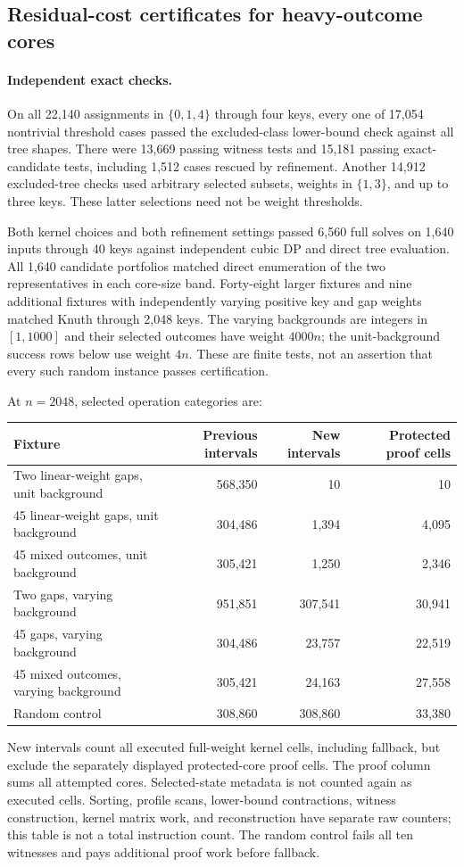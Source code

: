 \documentclass[11pt]{article}
\begin{document}
\subsection{Residual-cost certificates for heavy-outcome cores}
\paragraph{Independent exact checks.}
On all 22,140 assignments in $\{0,1,4\}$ through four keys, every one of
17,054 nontrivial threshold cases passed the excluded-class lower-bound
check against all tree shapes. There were 13,669 passing witness tests
and 15,181 passing exact-candidate tests, including 1,512 cases rescued
by refinement. Another 14,912 excluded-tree checks used arbitrary selected
subsets, weights in $\{1,3\}$, and up to three keys. These latter selections
need not be weight thresholds.

Both kernel choices and both refinement settings passed 6,560 full solves
on 1,640 inputs through 40 keys against independent cubic DP and direct
tree evaluation. All 1,640 candidate portfolios matched direct enumeration
of the two representatives in each core-size band. Forty-eight larger
fixtures and nine additional fixtures with independently varying positive
key and gap weights matched Knuth through 2,048 keys. The varying backgrounds
are integers in $[1,1000]$ and their selected outcomes have weight $4000n$;
the unit-background success rows below use weight $4n$. These are finite tests,
not an assertion that every such random instance passes certification.

At $n=2048$, selected operation categories are:
\begin{center}\small
\begin{tabular}{lrrr}
\toprule
Fixture & Previous intervals & New intervals & Protected proof cells\\
\midrule
Two linear-weight gaps, unit background & 568,350 & 10 & 10\\
45 linear-weight gaps, unit background & 304,486 & 1,394 & 4,095\\
45 mixed outcomes, unit background & 305,421 & 1,250 & 2,346\\
Two gaps, varying background & 951,851 & 307,541 & 30,941\\
45 gaps, varying background & 304,486 & 23,757 & 22,519\\
45 mixed outcomes, varying background & 305,421 & 24,163 & 27,558\\
Random control & 308,860 & 308,860 & 33,380\\
\bottomrule
\end{tabular}
\end{center}
New intervals count all executed full-weight kernel cells, including fallback,
but exclude the separately displayed protected-core proof cells. The proof
column sums all attempted cores. Selected-state metadata is not counted again
as executed cells. Sorting, profile scans, lower-bound contractions, witness
construction, kernel matrix work, and reconstruction have separate raw
counters; this table is not a total instruction count. The random control
fails all ten witnesses and pays additional proof work before fallback.
\end{document}
